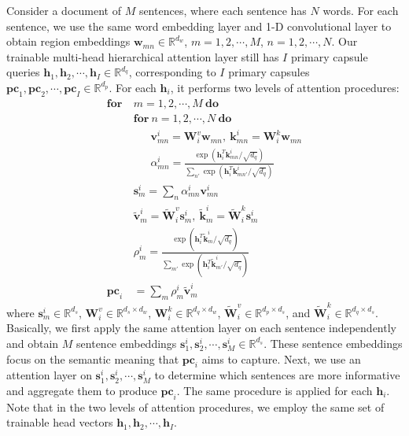 \documentclass[10pt,journal,compsoc]{IEEEtran}
\begin{document}
Consider a document of $M$ sentences, where each sentence has $N$ words. For each sentence, we use the same word embedding layer and 1-D convolutional layer to obtain region embeddings $\mathbf{w}_{mn} \in \mathbb{R}^{d_w}$, $m=1,2,\cdots,M$, $n=1,2,\cdots,N$. Our trainable multi-head hierarchical attention layer still has $I$ primary capsule queries $\mathbf{h}_1, \mathbf{h}_2, \cdots, \mathbf{h}_I \in \mathbb{R}^{d_q}$, corresponding to $I$ primary capsules $\mathbf{pc}_1, \mathbf{pc}_2, \cdots, \mathbf{pc}_I \in \mathbb{R}^{d_p}$. For each $\mathbf{h}_i$, it performs two levels of attention procedures:
\begin{align}
	\textbf{for}\ &m = 1,2,\cdots,M\ \textbf{do} \nonumber \\
	&\textbf{for}\ n = 1,2,\cdots,N\ \textbf{do} \nonumber \\
	&\ \ \ \ \ \ \ \mathbf{v}^i_{mn} = \mathbf{W}^{v}_i \mathbf{w}_{mn}, \ \mathbf{k}^i_{mn} = \mathbf{W}^{k}_i \mathbf{w}_{mn} \\
	&\ \ \ \ \ \ \ \alpha^i_{mn} = \frac{\exp({\mathbf{h}_i^T\mathbf{k}^i_{mn}/\sqrt{d_q}})}{\sum_{n'}\exp({\mathbf{h}_i^T\mathbf{k}^i_{mn'}/\sqrt{d_q}})} \\
	&\mathbf{s}^i_m = \sum_{n} \alpha^i_{mn} \mathbf{v}^i_{mn} \\
	&\tilde{\mathbf{v}}^i_m = \tilde{\mathbf{W}}^v_i \mathbf{s}^i_m, \ \tilde{\mathbf{k}}^i_m = \tilde{\mathbf{W}}^k_i \mathbf{s}^i_m \\
	&\rho^i_m = \frac{\exp({\mathbf{h}_i^T\tilde{\mathbf{k}}^i_m/\sqrt{d_q}})}{\sum_{m'}\exp({\mathbf{h}_i^T\tilde{\mathbf{k}}^i_{m'}/\sqrt{d_q}})} \\
	\mathbf{pc}_i &= \sum_{m} \rho^i_m \tilde{\mathbf{v}}^i_m
\end{align}
where $\mathbf{s}^i_{m} \in \mathbb{R}^{d_s}$, $\mathbf{W}^v_i \in \mathbb{R}^{d_s \times d_w}$, $\mathbf{W}^k_i \in \mathbb{R}^{d_q \times d_w}$, $\tilde{\mathbf{W}}^v_i \in \mathbb{R}^{d_p \times d_s}$, and $\tilde{\mathbf{W}}^k_i \in \mathbb{R}^{d_q \times d_s}$. Basically, we first apply the same attention layer on each sentence independently and obtain $M$ sentence embeddings $\mathbf{s}^i_{1}, \mathbf{s}^i_{2}, \cdots, \mathbf{s}^i_{M} \in \mathbb{R}^{d_s}$. These sentence embeddings focus on the semantic meaning that $\mathbf{pc}_i$ aims to capture. Next, we use an attention layer on $\mathbf{s}^i_{1}, \mathbf{s}^i_{2}, \cdots, \mathbf{s}^i_{M}$ to determine which sentences are more informative and aggregate them to produce $\mathbf{pc}_i$. The same procedure is applied for each $\mathbf{h}_i$. Note that in the two levels of attention procedures, we employ the same set of trainable head vectors $\mathbf{h}_1, \mathbf{h}_2, \cdots, \mathbf{h}_I$.
\end{document}
